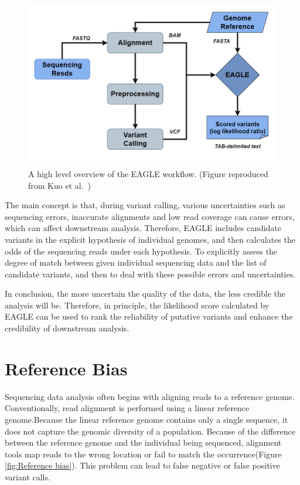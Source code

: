 \documentclass[PhD]{PHlab-thesis}
\begin{document}
\begin{figure}[h!]
	\centering
	\includegraphics[scale=0.3]{figures/EAGLE.png}
	\caption{A high level overview of the EAGLE workflow. (Figure reproduced from Kuo et al.~\cite{Kuo2018EAGLE})}
	\label{fig:EAGLE workflow} %
\end{figure}

The main concept is that, during variant calling, various uncertainties such as sequencing errors, inaccurate alignments and low read coverage can cause errors, which can affect downstream analysis. Therefore, EAGLE includes candidate variants in the explicit hypothesis of individual genomes, and then calculates the odds of the sequencing reads under each hypothesis. To explicitly assess the degree of match between given individual sequencing data and the list of candidate variants, and then to deal with these possible errors and uncertainties.

In conclusion, the more uncertain the quality of the data, the less credible the analysis will be. Therefore, in principle, the likelihood score calculated by EAGLE can be used to rank the reliability of putative variants and enhance the credibility of downstream analysis.

\section{Reference Bias}
Sequencing data analysis often begins with aligning reads to a reference genome. Conventionally, read alignment is performed using a linear reference genome.Because the linear reference genome contains only a single sequence, it does not capture the genomic diversity of a population. Because of the difference between the reference genome and the individual being sequenced, alignment tools map reads to the wrong location or fail to match the occurrence(Figure \ref{fig:Reference bias}). This problem can lead to false negative or false positive variant calls.
\end{document}
